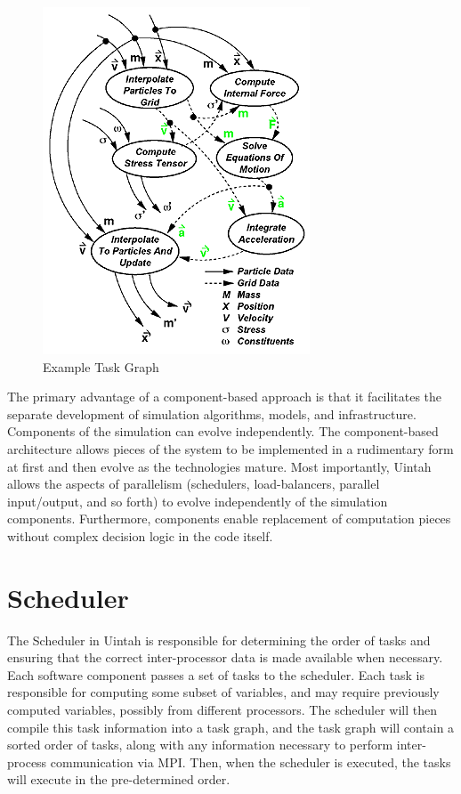 \documentclass[12pt]{report}
\begin{document}
\begin{figure}
  \includegraphics{Taskgraph-diagram.png}
  \caption{Example Task Graph}
  \label{fig:TaskGraph}
\end{figure}


The primary advantage of a component-based approach is that it
facilitates the separate development of simulation algorithms, models,
and infrastructure. Components of the simulation can evolve
independently. The component-based architecture allows pieces of the
system to be implemented in a rudimentary form at first and then
evolve as the technologies mature. Most importantly, Uintah allows the
aspects of parallelism (schedulers, load-balancers, parallel
input/output, and so forth) to evolve independently of the simulation
components. Furthermore, components enable replacement of computation
pieces without complex decision logic in the code itself.

\section{Scheduler}

The Scheduler in Uintah is responsible for determining the order of
tasks and ensuring that the correct inter-processor data is made
available when necessary. Each software component passes a set of
tasks to the scheduler. Each task is responsible for computing some
subset of variables, and may require previously computed variables,
possibly from different processors. The scheduler will then compile
this task information into a task graph, and the task graph will
contain a sorted order of tasks, along with any information necessary
to perform inter-process communication via MPI. Then, when the
scheduler is executed, the tasks will execute in the pre-determined
order.
\end{document}
